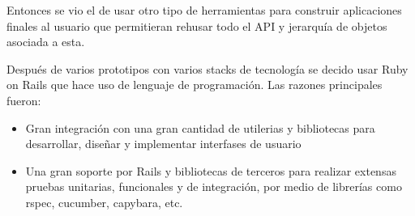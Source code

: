 \documentclass{article}
\begin{document}
Entonces se vio el de usar otro tipo de herramientas para construir
aplicaciones finales al usuario que permitieran rehusar todo el API
y jerarquía de objetos asociada a esta.

Después de varios prototipos con varios stacks de tecnología se decido
usar Ruby on Rails que hace uso de lenguaje de programación.
Las razones principales fueron:
\begin{itemize}
\item Gran integración con una gran cantidad de utilerias y bibliotecas para
  desarrollar, diseñar y implementar interfases de usuario
\item Una gran soporte por Rails y bibliotecas de terceros para
  realizar extensas pruebas unitarias, funcionales y de integración,
  por medio de librerías como rspec, cucumber, capybara, etc.
\end{itemize}
\end{document}
